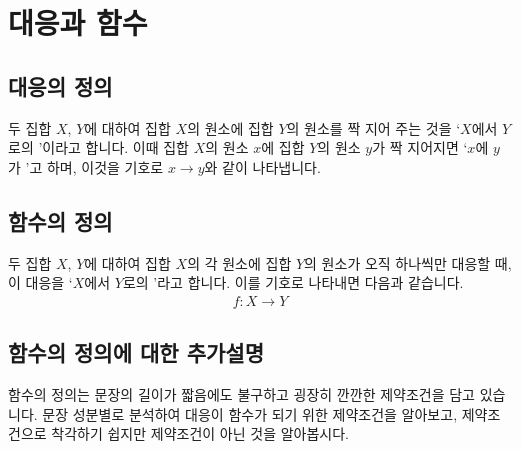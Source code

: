 \section{대응과 함수}  
\subsection{대응의 정의}
두 집합 $X$, $Y$에 대하여 집합 $X$의 원소에 집합 $Y$의 원소를 짝 지어 주는 것을 `$X$에서 $Y$로의 '이라고 합니다. 이때 집합 $X$의 원소 $x$에 집합 $Y$의 원소 $y$가 짝 지어지면 `$x$에 $y$가 '고 하며, 이것을 기호로 $x \longrightarrow y$와 같이 나타냅니다.

\subsection{함수의 정의}
두 집합 $X$, $Y$에 대하여 집합 $X$의 각 원소에 집합 $Y$의 원소가 오직 하나씩만 대응할 때, 이 대응을 `$X$에서 $Y$로의 '라고 합니다. 이를 기호로 나타내면 다음과 같습니다.
\begin{align*} f : X \longrightarrow Y\end{align*}

\subsection{함수의 정의에 대한 추가설명}
함수의 정의는 문장의 길이가 짧음에도 불구하고 굉장히 깐깐한 제약조건을 담고 있습니다. 문장 성분별로 분석하여 대응이 함수가 되기 위한 제약조건을 알아보고, 제약조건으로 착각하기 쉽지만 제약조건이 아닌 것을 알아봅시다.

